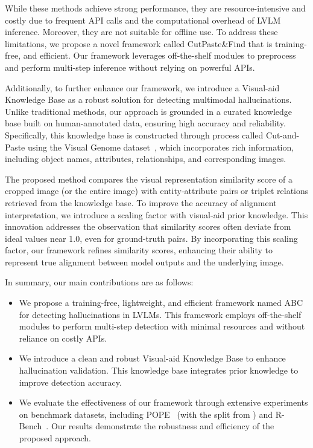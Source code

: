 While these methods achieve strong performance, they are resource-intensive and costly due to frequent API calls and the computational overhead of LVLM inference. Moreover, they are not suitable for offline use. To address these limitations, we propose a novel framework called CutPaste\&Find that is training-free, and efficient. Our framework leverages off-the-shelf modules to preprocess and perform multi-step inference without relying on powerful APIs. %

Additionally, to further enhance our framework, we introduce a Visual-aid Knowledge Base as a robust solution for detecting multimodal hallucinations. Unlike traditional methods, our approach is grounded in a curated knowledge base built on human-annotated data, ensuring high accuracy and reliability. Specifically, this knowledge base is constructed through process called Cut-and-Paste using the Visual Genome dataset~\cite{krishna2016visualgenomeconnectinglanguage}, which incorporates rich information, including object names, attributes, relationships, and corresponding images.

The proposed method compares the visual representation similarity score of a cropped image (or the entire image) with entity-attribute pairs or triplet relations retrieved from the knowledge base. To improve the accuracy of alignment interpretation, we introduce a scaling factor with visual-aid prior knowledge. This innovation addresses the observation that similarity scores often deviate from ideal values near 1.0, even for ground-truth pairs. By incorporating this scaling factor, our framework refines similarity scores, enhancing their ability to represent true alignment between model outputs and the underlying image.

In summary, our main contributions are as follows:

\begin{itemize}[leftmargin=*,itemsep=0pt]

\item  We propose a training-free, lightweight, and efficient framework named ABC for detecting hallucinations in LVLMs. This framework employs off-the-shelf modules to perform multi-step detection with minimal resources and without reliance on costly APIs.

\item We introduce a clean and robust Visual-aid Knowledge Base to enhance hallucination validation. This knowledge base integrates prior knowledge to improve detection accuracy.

\item We evaluate the effectiveness of our framework through extensive experiments on benchmark datasets, including POPE~\cite{li2023evaluating} (with the split from \cite{wu2024logical}) and R-Bench~\cite{pmlr-v235-wu24l}. Our results demonstrate the robustness and efficiency of the proposed approach.

\end{itemize}
